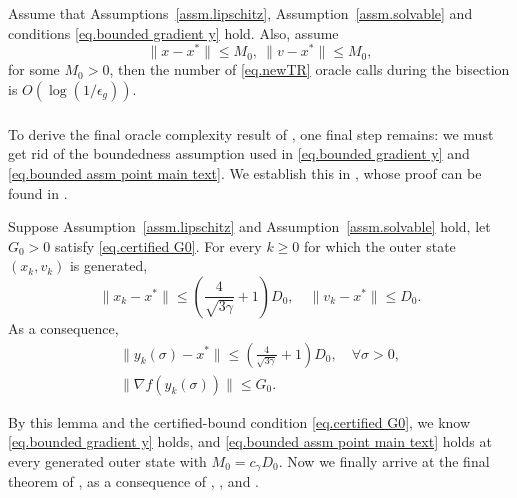 \documentclass[moor,sglanonrev]{informs4}
\begin{document}
\begin{lemma}
    \label{lem.complexity bisection}
    Assume that Assumptions~\ref{assm.lipschitz}, Assumption~\ref{assm.solvable} and conditions \eqref{eq.bounded gradient y} hold. Also, assume \begin{equation}\label{eq.bounded assm point main text}
        \|x-x^*\|\leq M_0, \ \|v-x^*\|\leq M_0,
    \end{equation}
    for some $M_0>0$, then the number of \ref{eq.newTR} oracle calls during the bisection is $O\left(\log \left(1/\epsilon_g\right)\right)$.
\end{lemma}
\subsubsection{}
To derive the final oracle complexity result of , one final step remains: we must get rid of the boundedness assumption used in \eqref{eq.bounded gradient y} and \eqref{eq.bounded assm point main text}. We establish this in , whose proof can be found in .
\begin{lemma}
    \label{lem.bounded iterate}
    Suppose Assumption~\ref{assm.lipschitz} and Assumption~\ref{assm.solvable} hold, let $G_0>0$ satisfy \eqref{eq.certified G0}. For every $k\geq0$ for which the outer state $(x_k,v_k)$ is generated,
    \begin{equation}
        \label{eq.bounded iterate}
        \|x_k- x^*\| \leq \left(\frac{4}{\sqrt{3\gamma}}+1\right)D_0, \quad \|v_k-x^*\|\leq D_0.
    \end{equation}
    As a consequence,
    \begin{gather}
        \label{eq.bounded iterate y}
        \|y_k(\sigma)-x^*\| \leq \left(\frac{4}{\sqrt{3\gamma}}+1\right)D_0, \quad \forall \sigma>0,\\
        \label{eq.ub yk sigma}
        \|\nabla f(y_k(\sigma))\| \leq G_0.
    \end{gather}
\end{lemma}
By this lemma and the certified-bound condition \eqref{eq.certified G0}, we know \eqref{eq.bounded gradient y} holds, and \eqref{eq.bounded assm point main text} holds at every generated outer state with $M_0 =c_\gamma D_0$. Now we finally arrive at the final theorem of , as a consequence of , , and .
\end{document}
